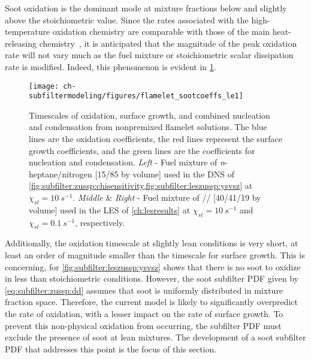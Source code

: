Soot oxidation is the dominant mode at mixture fractions below and slightly above the stoichiometric value. Since the rates associated with the high-temperature oxidation chemistry are comparable with those of the main heat-releasing chemistry~\cite{guo2016}, it is anticipated that the magnitude of the peak oxidation rate will not vary much as the fuel mixture or stoichiometric scalar dissipation rate is modified. Indeed, this phenomenon is evident in \cref{fig:subfilter:leszussp:kvsz}.

\begin{figure}[htb]
  \centering
  \texttt{[image: ch-subfiltermodeling/figures/flamelet\_sootcoeffs\_le1]}
  \caption[Soot Growth and Oxidation Timescales, 1/\texorpdfstring{$\tau$}{t} vs. \texorpdfstring{$Z$}{Z}]{Timescales of oxidation, surface growth, and combined nucleation and condensation from nonpremixed flamelet solutions. The blue lines are the oxidation coefficients, the red lines represent the surface growth coefficients, and the green lines are the coefficients for nucleation and condensation. \textit{Left} - Fuel mixture of \textit{n}-heptane/nitrogen [15/85 by volume] used in the DNS of \cref{fig:subfilter:zussp:chisensitivity,fig:subfilter:leszussp:ysvsz} at $\chi_{st} = 10\ s^{-1}$. \textit{Middle} \& \textit{Right} - Fuel mixture of // [40/41/19 by volume] used in the LES of \cref{ch:lesresults} at $\chi_{st} = 10\ s^{-1}$ and $\chi_{st} = 0.1\ s^{-1}$, respectively.}
  \label{fig:subfilter:leszussp:kvsz}
\end{figure}

Additionally, the oxidation timescale at slightly lean conditions is very short, at least an order of magnitude smaller than the timescale for surface growth. This is concerning, for \cref{fig:subfilter:leszussp:ysvsz} shows that there is no soot to oxidize in less than stoichiometric conditions. However, the soot subfilter PDF given by \cref{eq:subfilter:zussp:dd} assumes that soot is uniformly distributed in mixture fraction space. Therefore, the current model is likely to significantly overpredict the rate of oxidation, with a lesser impact on the rate of surface growth. To prevent this non-physical oxidation from occurring, the subfilter PDF must exclude the presence of soot at lean mixtures. The development of a soot subfilter PDF that addresses this point is the focus of this section.

